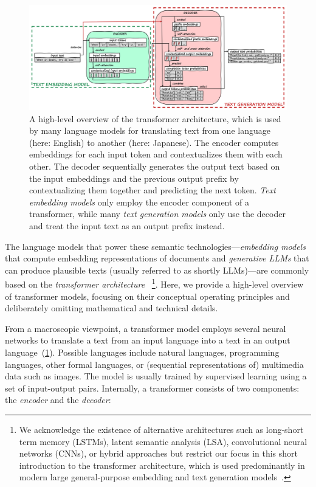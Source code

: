 \begin{figure}[Z]
	\centering
	\includegraphics[width=\linewidth]{04_semtec/transformer.png}
	\caption[A high-level overview of the transformer architecture.]{
		A high-level overview of the transformer architecture, which is used by many language models for translating text from one language (here: English) to another (here: Japanese).
		The encoder computes embeddings for each input token and contextualizes them with each other.
		The decoder sequentially generates the output text based on the input embeddings and the previous output prefix by contextualizing them together and predicting the next token.
		\emph{Text embedding models} only employ the encoder component of a transformer, while many \emph{text generation models} only use the decoder and treat the input text as an output prefix instead.
	}
	\label{fig:background/semtec/transformer}
\end{figure}

The language models that power these semantic technologies---\emph{embedding models} that compute embedding representations of documents and \emph{generative LLMs} that can produce plausible texts (usually referred to as shortly LLMs)---are commonly based on the \emph{transformer architecture}~\cite{vaswani2017attention}%
\footnote{
	We acknowledge the existence of alternative architectures such as long-short term memory (LSTMs), latent semantic analysis (LSA), convolutional neural networks (CNNs), or hybrid approaches but restrict our focus in this short introduction to the transformer architecture, which is used predominantly in modern large general-purpose embedding and text generation models~\cite{oralkbekova2023contemporary}.
}.
Here, we provide a high-level overview of transformer models, focusing on their conceptual operating principles and deliberately omitting mathematical and technical details.

From a macroscopic viewpoint, a transformer model employs several neural networks to translate a text from an input language into a text in an output language~(\cref{fig:background/semtec/transformer}).
Possible languages include natural languages, programming languages, other formal languages, or (sequential representations of) multimedia data such as images.
The model is usually trained by supervised learning using a set of input-output pairs.
Internally, a transformer consists of two components: the \emph{encoder} and the \emph{decoder}:

